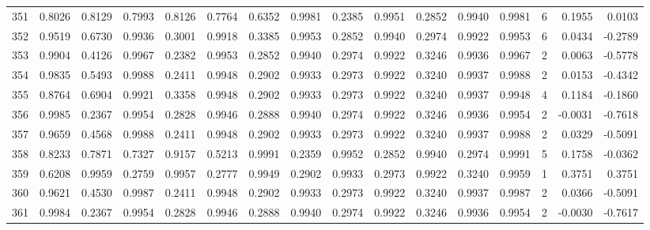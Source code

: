 \begin{tabular}{lrrrrrrrrrrrrrrr}
351 &      0.8026 &  0.8129 &  0.7993 &  0.8126 &  0.7764 &  0.6352 &  0.9981 &  0.2385 &  0.9951 &  0.2852 &   0.9940 &     0.9981 &      6 &                    0.1955 &                     0.0103 \\
352 &      0.9519 &  0.6730 &  0.9936 &  0.3001 &  0.9918 &  0.3385 &  0.9953 &  0.2852 &  0.9940 &  0.2974 &   0.9922 &     0.9953 &      6 &                    0.0434 &                    -0.2789 \\
353 &      0.9904 &  0.4126 &  0.9967 &  0.2382 &  0.9953 &  0.2852 &  0.9940 &  0.2974 &  0.9922 &  0.3246 &   0.9936 &     0.9967 &      2 &                    0.0063 &                    -0.5778 \\
354 &      0.9835 &  0.5493 &  0.9988 &  0.2411 &  0.9948 &  0.2902 &  0.9933 &  0.2973 &  0.9922 &  0.3240 &   0.9937 &     0.9988 &      2 &                    0.0153 &                    -0.4342 \\
355 &      0.8764 &  0.6904 &  0.9921 &  0.3358 &  0.9948 &  0.2902 &  0.9933 &  0.2973 &  0.9922 &  0.3240 &   0.9937 &     0.9948 &      4 &                    0.1184 &                    -0.1860 \\
356 &      0.9985 &  0.2367 &  0.9954 &  0.2828 &  0.9946 &  0.2888 &  0.9940 &  0.2974 &  0.9922 &  0.3246 &   0.9936 &     0.9954 &      2 &                   -0.0031 &                    -0.7618 \\
357 &      0.9659 &  0.4568 &  0.9988 &  0.2411 &  0.9948 &  0.2902 &  0.9933 &  0.2973 &  0.9922 &  0.3240 &   0.9937 &     0.9988 &      2 &                    0.0329 &                    -0.5091 \\
358 &      0.8233 &  0.7871 &  0.7327 &  0.9157 &  0.5213 &  0.9991 &  0.2359 &  0.9952 &  0.2852 &  0.9940 &   0.2974 &     0.9991 &      5 &                    0.1758 &                    -0.0362 \\
359 &      0.6208 &  0.9959 &  0.2759 &  0.9957 &  0.2777 &  0.9949 &  0.2902 &  0.9933 &  0.2973 &  0.9922 &   0.3240 &     0.9959 &      1 &                    0.3751 &                     0.3751 \\
360 &      0.9621 &  0.4530 &  0.9987 &  0.2411 &  0.9948 &  0.2902 &  0.9933 &  0.2973 &  0.9922 &  0.3240 &   0.9937 &     0.9987 &      2 &                    0.0366 &                    -0.5091 \\
361 &      0.9984 &  0.2367 &  0.9954 &  0.2828 &  0.9946 &  0.2888 &  0.9940 &  0.2974 &  0.9922 &  0.3246 &   0.9936 &     0.9954 &      2 &                   -0.0030 &                    -0.7617 \\

\end{tabular}
